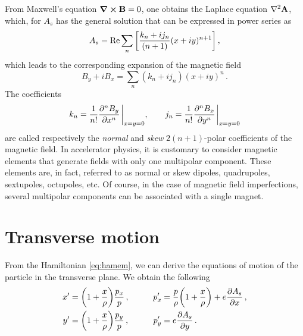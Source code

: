From Maxwell's equation $\curl\mathbf{B}=0$, one obtains the Laplace equation $\laplacian\mathbf{A}$, which, for $A_s$ has the general solution that can be expressed in power series as
%
\begin{equation}
	A_s = \Re\sum_{n}\qty[ \frac{k_n + ij_n}{(n+1)}(x+iy)^{n+1}]\, ,%
	\label{eq:as}
\end{equation}
%
which leads to the corresponding expansion of the magnetic field
\begin{equation}
	B_y + iB_x = \sum_n (k_n + ij_n) (x+iy)^n\,.
\end{equation}
%
The coefficients
\begin{equation}
	k_n = \frac{1}{n!} \pdv[n]{B_y}{x}\eval_{x=y=0}, \qquad 
	j_n = \frac{1}{n!} \pdv[n]{B_x}{y}\eval_{x=y=0} 
\end{equation}
%
are called respectively the \textit{normal} and \textit{skew} $2(n+1)$-polar coefficients of the magnetic field. In accelerator physics, it is customary to consider magnetic elements that generate fields with only one multipolar component. These elements are, in fact, referred to as normal or skew dipoles, quadrupoles, sextupoles, octupoles, etc. Of course, in the case of magnetic field imperfections, several multipolar components can be associated with a single magnet.

%
\section{Transverse motion} \label{sec:acc:transverse}
%

From the Hamiltonian \eqref{eq:hamem}, we can derive the equations of motion of the particle in the transverse plane. We obtain the following
%
\begin{equation}
    \begin{aligned}
        x' &= \qty(1+\frac{x}{\rho})\frac{p_x}{p}\,, &\qquad p_x' &= \frac{p}{\rho}\qty(1+\frac{x}{\rho}) + e\pdv{A_s}{x}\,,\\ %
        y' &= \qty(1+\frac{x}{\rho})\frac{p_y}{p}\,, &\qquad p_y' &= e\pdv{A_s}{y}\,.
    \end{aligned}
    \label{eq:ham_motion}
\end{equation}

